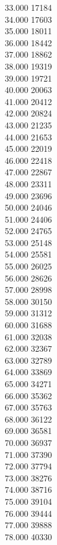 { 33.000	17184 \\
 34.000	17603 \\
 35.000	18011 \\
 36.000	18442 \\
 37.000	18862 \\
 38.000	19319 \\
 39.000	19721 \\
 40.000	20063 \\
 41.000	20412 \\
 42.000	20824 \\
 43.000	21235 \\
 44.000	21653 \\
 45.000	22019 \\
 46.000	22418 \\
 47.000	22867 \\
 48.000	23311 \\
 49.000	23696 \\
 50.000	24046 \\
 51.000	24406 \\
 52.000	24765 \\
 53.000	25148 \\
 54.000	25581 \\
 55.000	26025 \\
 56.000	28626 \\
 57.000	28998 \\
 58.000	30150 \\
 59.000	31312 \\
 60.000	31688 \\
 61.000	32038 \\
 62.000	32367 \\
 63.000	32789 \\
 64.000	33869 \\
 65.000	34271 \\
 66.000	35362 \\
 67.000	35763 \\
 68.000	36122 \\
 69.000	36581 \\
 70.000	36937 \\
 71.000	37390 \\
 72.000	37794 \\
 73.000	38276 \\
 74.000	38716 \\
 75.000	39104 \\
 76.000	39444 \\
 77.000	39888 \\
 78.000	40330 \\
}
